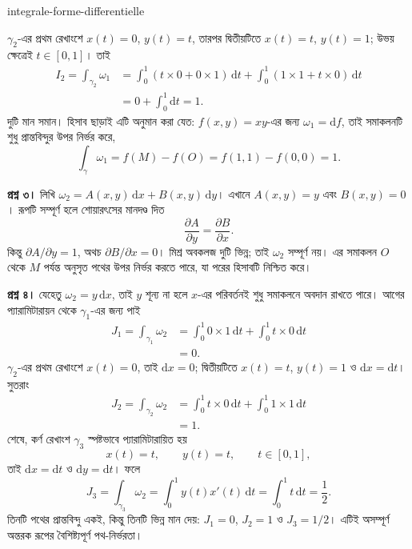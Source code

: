 \begin{exo}{integrale-forme-differentielle}
\begin{solution}
$\gamma_2$-এর প্রথম রেখাংশে $x(t)=0$, $y(t)=t$, তারপর দ্বিতীয়টিতে
$x(t)=t$, $y(t)=1$; উভয় ক্ষেত্রেই $t\in[0,1]$। তাই
\[
\begin{aligned}
I_2
= \int_{\gamma_2}\omega_1
&= \int_0^1\left(t\times 0+0\times 1\right)\,\mathrm{d}t
 + \int_0^1\left(1\times 1+t\times 0\right)\,\mathrm{d}t \\
&= 0+\int_0^1\mathrm{d}t = 1.
\end{aligned}
\]
দুটি মান সমান। হিসাব ছাড়াই এটি অনুমান করা যেত: $f(x,y)=xy$-এর জন্য
$\omega_1=\mathrm{d}f$, তাই সমাকলনটি শুধু প্রান্তবিন্দুর উপর নির্ভর করে,
\[
\int_\gamma\omega_1=f(M)-f(O)=f(1,1)-f(0,0)=1.
\]

\textbf{প্রশ্ন ৩।} লিখি $\omega_2=A(x,y)\,\mathrm{d}x+B(x,y)\,\mathrm{d}y$।
এখানে $A(x,y)=y$ এবং $B(x,y)=0$। রূপটি সম্পূর্ণ হলে শোয়ারৎসের মানদণ্ড দিত
\[
\frac{\partial A}{\partial y}=\frac{\partial B}{\partial x}.
\]
কিন্তু $\partial A/\partial y=1$, অথচ $\partial B/\partial x=0$। মিশ্র
অবকলজ দুটি ভিন্ন; তাই $\omega_2$ সম্পূর্ণ নয়। এর সমাকলন $O$ থেকে $M$
পর্যন্ত অনুসৃত পথের উপর নির্ভর করতে পারে, যা পরের হিসাবটি নিশ্চিত করে।

\textbf{প্রশ্ন ৪।} যেহেতু $\omega_2=y\,\mathrm{d}x$, তাই $y$ শূন্য না হলে
$x$-এর পরিবর্তনই শুধু সমাকলনে অবদান রাখতে পারে। আগের প্যারামিটারায়ন থেকে
$\gamma_1$-এর জন্য পাই
\[
\begin{aligned}
J_1
=\int_{\gamma_1}\omega_2
&=\int_0^1 0\times 1\,\mathrm{d}t
  +\int_0^1 t\times 0\,\mathrm{d}t \\
&=0.
\end{aligned}
\]
$\gamma_2$-এর প্রথম রেখাংশে $x(t)=0$, তাই $\mathrm{d}x=0$; দ্বিতীয়টিতে
$x(t)=t$, $y(t)=1$ ও $\mathrm{d}x=\mathrm{d}t$। সুতরাং
\[
\begin{aligned}
J_2
=\int_{\gamma_2}\omega_2
&=\int_0^1 t\times 0\,\mathrm{d}t
  +\int_0^1 1\times 1\,\mathrm{d}t \\
&=1.
\end{aligned}
\]
শেষে, কর্ণ রেখাংশ $\gamma_3$ স্পষ্টভাবে প্যারামিটারায়িত হয়
\[
x(t)=t,\qquad y(t)=t,\qquad t\in[0,1],
\]
তাই $\mathrm{d}x=\mathrm{d}t$ ও $\mathrm{d}y=\mathrm{d}t$। ফলে
\[
J_3
=\int_{\gamma_3}\omega_2
=\int_0^1 y(t)x'(t)\,\mathrm{d}t
=\int_0^1 t\,\mathrm{d}t
=\frac12.
\]
তিনটি পথের প্রান্তবিন্দু একই, কিন্তু তিনটি ভিন্ন মান দেয়: $J_1=0$,
$J_2=1$ ও $J_3=1/2$। এটিই অসম্পূর্ণ অন্তরক রূপের বৈশিষ্ট্যপূর্ণ পথ-নির্ভরতা।
\end{solution}
\end{exo}

